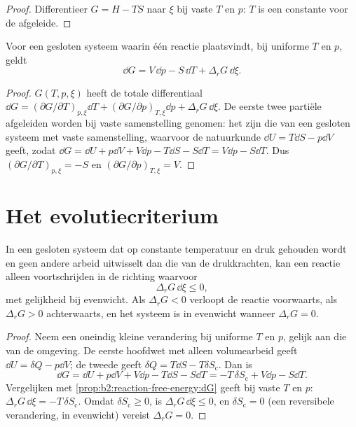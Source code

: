 \begin{proof}
Differentieer $G = H - TS$ naar $\xi$ bij vaste $T$ en $p$: $T$
is een constante voor de afgeleide.
\end{proof}

\begin{proposition}\label{prop:b2:reaction-free-energy:dG}
Voor een gesloten systeem waarin één reactie plaatsvindt, bij uniforme $T$ en
$p$, geldt
\[
  \dd G = V\,\dd p - S\,\dd T + \Delta_r G\,\dd\xi .
\]
\end{proposition}

\begin{proof}
$G(T, p, \xi)$ heeft de totale differentiaal $\dd G = (\partial G/\partial
T)_{p,\xi}\dd T + (\partial G/\partial p)_{T,\xi}\dd p + \Delta_r G\,\dd\xi$.
De eerste twee partiële afgeleiden worden bij vaste samenstelling genomen: het zijn
die van een gesloten systeem met vaste samenstelling, waarvoor de natuurkunde
$\dd U = T\dd S - p\dd V$ geeft, zodat $\dd G = \dd U + p\dd V + V\dd p - T\dd S
- S\dd T = V\dd p - S\dd T$. Dus $(\partial G/\partial T)_{p,\xi} = -S$
en $(\partial G/\partial p)_{T,\xi} = V$.
\end{proof}

\section{Het evolutiecriterium}

\begin{theorem}[Evolutiecriterium]\label{thm:b2:reaction-free-energy:evolution}
In een gesloten systeem dat op constante temperatuur en druk gehouden wordt en geen
andere arbeid uitwisselt dan die van de drukkrachten, kan een reactie alleen voortschrijden in
de richting waarvoor
\[
  \Delta_r G\,\dd\xi \leq 0 ,
\]
met gelijkheid bij evenwicht. Als $\Delta_r G < 0$ verloopt de reactie
voorwaarts, als $\Delta_r G > 0$ achterwaarts, en het systeem is in
evenwicht wanneer $\Delta_r G = 0$.
\end{theorem}

\begin{proof}
Neem een oneindig kleine verandering bij uniforme $T$ en $p$, gelijk aan die van de
omgeving. De eerste hoofdwet met alleen volumearbeid geeft $\dd U = \delta Q
- p\dd V$; de tweede geeft $\delta Q = T\dd S - T\delta S_{\text{c}}$. Dan is
\[
  \dd G = \dd U + p\dd V + V\dd p - T\dd S - S\dd T = -T\,\delta
  S_{\text{c}} + V\dd p - S\dd T .
\]
Vergelijken met \cref{prop:b2:reaction-free-energy:dG} geeft bij vaste $T$ en $p$:
$\Delta_r G\,\dd\xi = -T\,\delta S_{\text{c}}$. Omdat $\delta S_{\text{c}}
\geq 0$, is $\Delta_r G\,\dd\xi \leq 0$, en $\delta S_{\text{c}} = 0$ (een
reversibele verandering, in evenwicht) vereist $\Delta_r G = 0$.
\end{proof}

